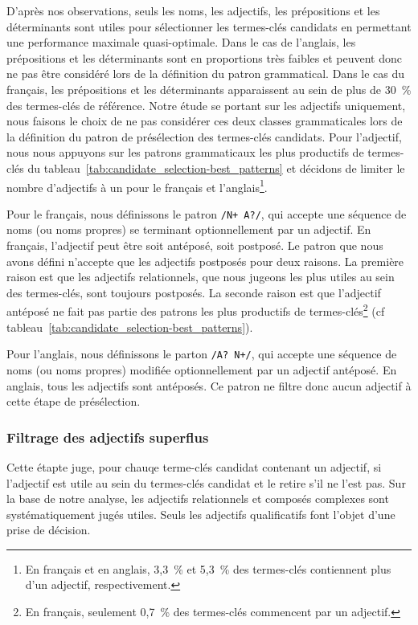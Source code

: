         D'après nos observations, seuls les noms, les adjectifs, les
        prépositions et les déterminants sont utiles pour sélectionner les
        termes-clés candidats en permettant une performance maximale
        quasi-optimale. Dans le cas de l'anglais, les prépositions et les
        déterminants sont en proportions très faibles et peuvent donc ne pas
        être considéré lors de la définition du patron grammatical. Dans le cas
        du français, les prépositions et les déterminants apparaissent au sein
        de plus de 30~\% des termes-clés de référence. Notre étude se portant
        sur les adjectifs uniquement, nous faisons le choix de ne pas considérer
        ces deux classes grammaticales lors de la définition du patron de
        présélection des termes-clés candidats. Pour l'adjectif, nous nous
        appuyons sur les patrons grammaticaux les plus productifs de termes-clés
        du tableau~\ref{tab:candidate_selection-best_patterns} et décidons de
        limiter le nombre d'adjectifs à un pour le français et
        l'anglais\footnote{En français et en anglais, 3,3~\% et 5,3~\% des
        termes-clés contiennent plus d'un adjectif, respectivement.}.
        
        Pour le français, nous définissons le patron \texttt{/N+ A?/}, qui
        accepte une séquence de noms (ou noms propres) se terminant
        optionnellement par un adjectif. En français, l'adjectif peut être soit
        antéposé, soit postposé. Le patron que nous avons défini n'accepte que
        les adjectifs postposés pour deux raisons. La première raison est que
        les adjectifs relationnels, que nous jugeons les
        plus utiles au sein des termes-clés, sont toujours postposés. La seconde
        raison est que l'adjectif antéposé ne fait pas partie des patrons les
        plus productifs de termes-clés\footnote{En français, seulement 0,7~\%
        des termes-clés commencent par un adjectif.} (cf
        tableau~\ref{tab:candidate_selection-best_patterns}).
        
        Pour l'anglais, nous définissons le parton \texttt{/A? N+/}, qui accepte
        une séquence de noms (ou noms propres) modifiée optionnellement par un
        adjectif antéposé. En anglais, tous les adjectifs sont antéposés. Ce
        patron ne filtre donc aucun adjectif à cette étape de présélection.

      \subsubsection{Filtrage des adjectifs superflus}
      \label{subsubsec:main:domain_independent_keyphrase_extraction-keyphrase_candidate_selection-modifiers_filtering-adjective_filtering}
        Cette étapte juge, pour chauqe terme-clés candidat contenant un
        adjectif, si l'adjectif est utile au sein du termes-clés candidat et le
        retire s'il ne l'est pas. Sur la base de notre analyse, les adjectifs
        relationnels et composés complexes sont systématiquement jugés utiles.
        Seuls les adjectifs qualificatifs font l'objet d'une prise de décision.

